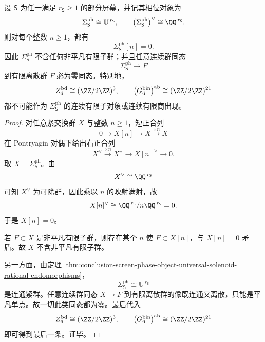 \begin{theorem}\label{thm:conclusion-screenphase-universal-solenoid-no-finite-torsion}
设 \(\mathsf S\) 为任一满足 \(r_{\mathsf S}\ge 1\) 的部分屏幕，并记其相位对象为
\[
\Sigma_{\mathsf S}^{\mathrm{ph}}\cong \mathbb U^{\,r_{\mathsf S}},
\qquad
\bigl(\Sigma_{\mathsf S}^{\mathrm{ph}}\bigr)^\vee\cong \QQ^{\,r_{\mathsf S}}.
\]
则对每个整数 \(n\ge 1\)，都有
\[
\Sigma_{\mathsf S}^{\mathrm{ph}}[n]=0.
\]
因此 \(\Sigma_{\mathsf S}^{\mathrm{ph}}\) 不含任何非平凡有限子群；并且任意连续群同态
\[
\Sigma_{\mathsf S}^{\mathrm{ph}}\longrightarrow F
\]
到有限离散群 \(F\) 必为零同态。特别地，
\[
Z_6^{\mathrm{bd}}\cong (\ZZ/2\ZZ)^3,
\qquad
\bigl(G_6^{\mathrm{bin}}\bigr)^{\mathrm{ab}}\cong (\ZZ/2\ZZ)^{21}
\]
都不可能作为 \(\Sigma_{\mathsf S}^{\mathrm{ph}}\) 的连续有限子对象或连续有限商出现。
\end{theorem}
\begin{proof}
对任意紧交换群 \(X\) 与整数 \(n\ge 1\)，短正合列
\[
0\longrightarrow X[n]\longrightarrow X\xrightarrow{\times n}X
\]
在 Pontryagin 对偶下给出右正合列
\[
X^\vee\xrightarrow{\times n}X^\vee\longrightarrow X[n]^\vee\longrightarrow 0.
\]
取 \(X=\Sigma_{\mathsf S}^{\mathrm{ph}}\)。由
\[
X^\vee\cong \QQ^{\,r_{\mathsf S}}
\]
可知 \(X^\vee\) 为可除群，因此乘以 \(n\) 的映射满射，故
\[
X[n]^\vee\cong \QQ^{\,r_{\mathsf S}}/n\QQ^{\,r_{\mathsf S}}=0.
\]
于是 \(X[n]=0\)。

若 \(F\subset X\) 是非平凡有限子群，则存在某个 \(n\) 使 \(F\subset X[n]\)，与 \(X[n]=0\) 矛盾。故 \(X\) 不含非平凡有限子群。

另一方面，由定理 \ref{thm:conclusion-screen-phase-object-universal-solenoid-rational-endomorphisms}，
\[
\Sigma_{\mathsf S}^{\mathrm{ph}}\cong \mathbb U^{\,r_{\mathsf S}}
\]
是连通紧群。任意连续群同态 \(X\to F\) 到有限离散群的像既连通又离散，只能是平凡单点。故一切此类同态都为零。最后代入
\[
Z_6^{\mathrm{bd}}\cong (\ZZ/2\ZZ)^3,
\qquad
\bigl(G_6^{\mathrm{bin}}\bigr)^{\mathrm{ab}}\cong (\ZZ/2\ZZ)^{21}
\]
即可得到最后一条。证毕。
\end{proof}

